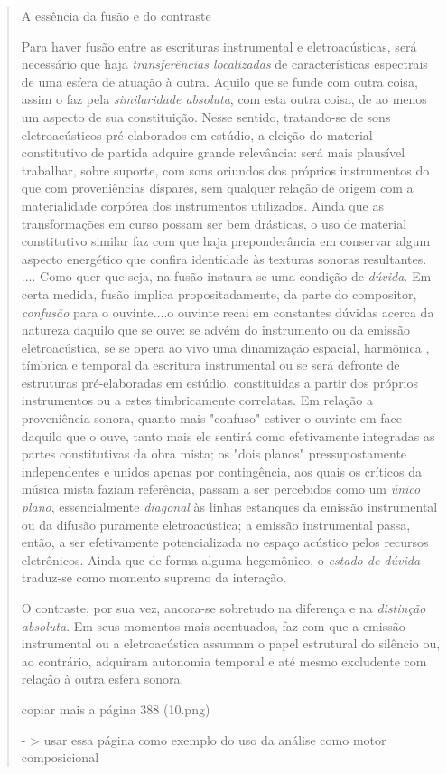 \documentclass[draft]{ppgmus}
\begin{document}
\begin{quotation}

A essência da fusão e do contraste

Para haver fusão entre as escrituras instrumental e eletroacústicas,
será necessário que haja \textit{transferências localizadas} de 
características espectrais de uma esfera de atuação à outra.
Aquilo que se funde com outra coisa, assim o faz pela \textit{similaridade
absoluta}, com esta outra coisa, de ao menos um aspecto de sua 
constituição. Nesse sentido, tratando-se de sons eletroacústicos 
pré-elaborados em estúdio, a eleição do material constitutivo de partida
adquire grande relevância: será mais plausível trabalhar, sobre suporte,
com sons oriundos dos próprios instrumentos do que com proveniências
díspares, sem qualquer relação de origem com a materialidade corpórea
dos instrumentos utilizados. Ainda que as transformações em curso possam ser
bem drásticas, o uso de material constitutivo similar faz com que
haja preponderância em conservar algum aspecto energético que confira
identidade às texturas sonoras resultantes.
....
Como quer que seja, na fusão instaura-se uma condição de \textit{dúvida}.
Em certa medida, fusão implica propositadamente, da parte do compositor,
\textit{confusão} para o ouvinte....o ouvinte recai em constantes dúvidas
acerca da natureza daquilo que se ouve: se advém do instrumento ou da 
emissão eletroacústica, se se opera ao vivo uma dinamização espacial, harmônica
, tímbrica e temporal da escritura instrumental ou se será defronte de
estruturas pré-elaboradas em estúdio, constituidas a partir dos próprios
instrumentos ou a estes timbricamente correlatas. Em relação a proveniência
sonora, quanto mais "confuso" estiver o ouvinte em face daquilo que
o ouve, tanto mais ele sentirá como efetivamente integradas as partes
constitutivas da obra mista; os "dois planos" pressupostamente independentes
e unidos apenas por contingência, aos quais os críticos da música mista
faziam referência, passam a ser percebidos como um \textit{único plano},
essencialmente \textit{diagonal} às linhas estanques da emissão instrumental
ou da difusão puramente eletroacústica; a emissão instrumental passa,
então, a ser efetivamente potencializada no espaço acústico pelos recursos 
eletrônicos. Ainda que de forma alguma hegemônico, o \textit{estado de
dúvida} traduz-se como momento supremo da interação.

O contraste, por sua vez, ancora-se sobretudo na diferença e na 
\textit{distinção absoluta}. Em seus momentos mais acentuados, faz com
que a emissão instrumental ou a eletroacústica assumam o papel estrutural
do silêncio ou, ao contrário, adquiram autonomia temporal e até mesmo
excludente com relação à outra esfera sonora.


copiar mais a página 388 (10.png)

- > usar essa página como exemplo do uso da análise como motor 
composicional

\end{quotation}
\end{document}
